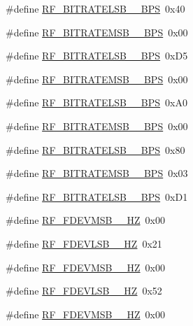 \begin{DoxyCompactItemize}
\#define \mbox{\hyperlink{sx1276_regs-_fsk_8h_ac8a775e0079f97d0da847bcbc743f8b8}{R\+F\+\_\+\+B\+I\+T\+R\+A\+T\+E\+L\+S\+B\+\_\+\_\+\+B\+PS}}~0x40
\item 
\#define \mbox{\hyperlink{sx1276_regs-_fsk_8h_adb3227e86cec303479803ee36c94dc12}{R\+F\+\_\+\+B\+I\+T\+R\+A\+T\+E\+M\+S\+B\+\_\+\_\+\+B\+PS}}~0x00
\item 
\#define \mbox{\hyperlink{sx1276_regs-_fsk_8h_a4c354668226a9b7cbc899d1571eb7f6a}{R\+F\+\_\+\+B\+I\+T\+R\+A\+T\+E\+L\+S\+B\+\_\+\_\+\+B\+PS}}~0x\+D5
\item 
\#define \mbox{\hyperlink{sx1276_regs-_fsk_8h_a2820d9407f3f886ccc4b95f37bdba43a}{R\+F\+\_\+\+B\+I\+T\+R\+A\+T\+E\+M\+S\+B\+\_\+\_\+\+B\+PS}}~0x00
\item 
\#define \mbox{\hyperlink{sx1276_regs-_fsk_8h_a5dc775df5325cee5e4f068777ec7d0ce}{R\+F\+\_\+\+B\+I\+T\+R\+A\+T\+E\+L\+S\+B\+\_\+\_\+\+B\+PS}}~0x\+A0
\item 
\#define \mbox{\hyperlink{sx1276_regs-_fsk_8h_a2929fca60be7a159f4f0b3768f60d811}{R\+F\+\_\+\+B\+I\+T\+R\+A\+T\+E\+M\+S\+B\+\_\+\_\+\+B\+PS}}~0x00
\item 
\#define \mbox{\hyperlink{sx1276_regs-_fsk_8h_a39ce2c4b4f89ca91ee4a9a943341a75f}{R\+F\+\_\+\+B\+I\+T\+R\+A\+T\+E\+L\+S\+B\+\_\+\_\+\+B\+PS}}~0x80
\item 
\#define \mbox{\hyperlink{sx1276_regs-_fsk_8h_a7110c5c5081018aa2856943a0cf1223c}{R\+F\+\_\+\+B\+I\+T\+R\+A\+T\+E\+M\+S\+B\+\_\+\_\+\+B\+PS}}~0x03
\item 
\#define \mbox{\hyperlink{sx1276_regs-_fsk_8h_a358a84803ccf3e4c4896cdbd43576c08}{R\+F\+\_\+\+B\+I\+T\+R\+A\+T\+E\+L\+S\+B\+\_\+\_\+\+B\+PS}}~0x\+D1
\item 
\#define \mbox{\hyperlink{sx1276_regs-_fsk_8h_a5f494883fb5d77b75be547962cc3bc55}{R\+F\+\_\+\+F\+D\+E\+V\+M\+S\+B\+\_\+\_\+\+HZ}}~0x00
\item 
\#define \mbox{\hyperlink{sx1276_regs-_fsk_8h_acf567929b56d3921b2d717142b29275b}{R\+F\+\_\+\+F\+D\+E\+V\+L\+S\+B\+\_\+\_\+\+HZ}}~0x21
\item 
\#define \mbox{\hyperlink{sx1276_regs-_fsk_8h_ae6ae0e5b1aa1a2bdd92b3c9fccdb533c}{R\+F\+\_\+\+F\+D\+E\+V\+M\+S\+B\+\_\+\_\+\+HZ}}~0x00
\item 
\#define \mbox{\hyperlink{sx1276_regs-_fsk_8h_adafffdefc88466fdb255869839356960}{R\+F\+\_\+\+F\+D\+E\+V\+L\+S\+B\+\_\+\_\+\+HZ}}~0x52
\item 
\#define \mbox{\hyperlink{sx1276_regs-_fsk_8h_a687bcf3879dd873acbd21cba5b7142c5}{R\+F\+\_\+\+F\+D\+E\+V\+M\+S\+B\+\_\+\_\+\+HZ}}~0x00

\end{DoxyCompactItemize}
